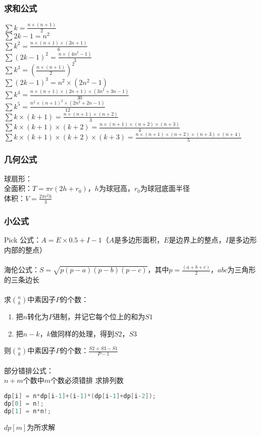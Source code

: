     \subsubsection{求和公式}
	$\sum{k} = \frac{n\times (n+1)}{2}$\\
	$\sum{2k-1} = n^{2}$\\
	$\sum{k^{2}} = \frac{n\times (n+1)\times (2n+1)}{6}$\\
	$\sum{(2k-1)^{2}} = \frac{n\times (4n^{2}-1)}{3}$\\
	$\sum{k^{3}} = (\frac{n\times (n+1)}{2})^{2}$\\
	$\sum{(2k-1)^{3}} = n^{2}\times (2n^{2}-1)$\\
	$\sum{k^{4}} = \frac{n\times (n+1)\times (2n+1)\times (3n^{2}+3n-1)}{30}$\\
	$\sum{k^{5}} = \frac{n^{2}\times (n+1)^{2}\times (2n^{2}+2n-1)}{12}$\\
	$\sum{k\times (k+1)} = \frac{n\times (n+1)\times (n+2)}{3}$\\
	$\sum{k\times (k+1)\times (k+2)} = \frac{n\times (n+1)\times (n+2)\times (n+3)}{4}$\\
	$\sum{k\times (k+1)\times (k+2)\times (k+3)} = \frac{n\times (n+1)\times (n+2)\times (n+3)\times (n+4)}{5}$\\
    
    \subsubsection{几何公式}
	球扇形：\\
	全面积：$T = \pi r(2h+r_0)$，$h$为球冠高，$r_0$为球冠底面半径\\
	体积：$V = \frac{2\pi r^{2}h}{3}$\\
    
    \subsubsection{小公式}
    Pick 公式：$A = E\times 0.5+I-1$（$A$是多边形面积，$E$是边界上的整点，$I$是多边形内部的整点）\\
    \\
    海伦公式：$S = \sqrt{p(p-a)(p-b)(p-c)}$，其中$p = \frac{(a+b+c)}{2}$，$abc$为三角形的三条边长\\
    \\
    求$\binom{n}{k}$中素因子$P$的个数：\\
    \begin {enumerate}
	\item 把$n$转化为$P$进制，并记它每个位上的和为$S1$
	\item 把$n-k$，$k$做同样的处理，得到$S2$，$S3$
    \end{enumerate}
    则$\binom{n}{k}$中素因子$P$的个数：$\frac{S2+S3-S1}{P-1}$\\
    \\
    部分错排公式：\\
    $n+m$个数中$m$个数必须错排 求排列数
    \begin{lstlisting}[language=c++]
dp[i] = n*dp[i-1]+(i-1)*(dp[i-1]+dp[i-2]);
dp[0] = n!;
dp[1] = n*n!;
    \end{lstlisting}
    $dp[m]$为所求解\\
